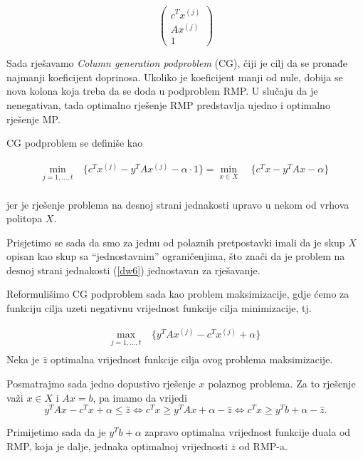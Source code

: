 \documentclass[a4paper, utf8, 11pt, colorlinks]{book}
\theoremstyle{definition}
\begin{document}
 $$\left(\begin{array}{c}
 	c^T x^{(j)}\\
 	A x^{(j)} \\
 	1 
 \end{array}\right)$$
 
 Sada rješavamo \emph{Column generation podproblem} (CG), čiji je cilj da se pronađe najmanji koeficijent doprinosa. Ukoliko je koeficijent manji od nule, dobija se nova kolona koja treba da se doda u podproblem RMP.  U slučaju da je nenegativan, tada  optimalno rješenje RMP predstavlja ujedno i optimalno rješenje MP.
 
 CG podproblem se definiše kao
 
      \begin{equation}
 	\begin{aligned}\label{dw6}
 		\min_{j=1,\ldots,t}\  & \{c^T x^{(j)} -y^T	Ax^{(j)}-\alpha\cdot 1\}=\min_{x\in X}\  & \{c^Tx-y^T	Ax-\alpha\}\\
 	\end{aligned}
 \end{equation}
 
jer je rješenje problema na desnoj strani jednakosti upravo u nekom od vrhova politopa $X$.

Prisjetimo se sada da smo za jednu od polaznih pretpostavki imali da je skup $X$ opisan kao skup sa ``jednostavnim'' ograničenjima, što znači da je problem na desnoj strani jednakosti (\ref{dw6}) jednostavan za rješavanje.

Reformulišimo  CG podproblem sada kao problem maksimizacije, gdje ćemo za funkciju cilja uzeti negativnu vrijednost funkcije cilja minimizacije, tj.
 
 
       \begin{equation}
 	\begin{aligned}\label{dw7}
 		\max_{j=1,\ldots,t}\  &  \{y^T	Ax^{(j)}-c^Tx^{(j)}+\alpha\}\\
 	\end{aligned}
 \end{equation}
Neka je $\hat{z}$ optimalna vrijednost funkcije cilja ovog problema maksimizacije.

Posmatrajmo sada jedno dopustivo rješenje $x$ polaznog problema. Za to rješenje važi 
$x\in X$ i $Ax=b$, pa imamo da vrijedi %
 $$y^T	Ax-c^Tx+\alpha\leqslant \hat{z} \Leftrightarrow c^Tx\geqslant y^T	Ax+\alpha-\hat{z} \Leftrightarrow  c^T x \geqslant y^T b+\alpha-\hat{z}.$$
 
 Primijetimo sada da je  $y^T b+\alpha$ zapravo  optimalna vrijednost funkcije duala od RMP, koja je dalje, jednaka optimalnoj vrijednosti $\overline{z}$ od RMP-a. 
 
\end{document}
